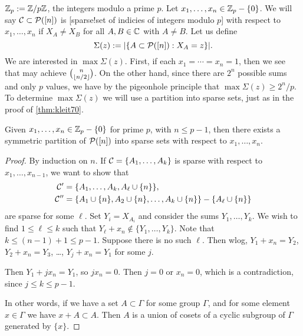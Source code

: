  $\Z_p:=\Z/p\Z$, the integers modulo a prime $p$. Let $x_1,\dotsc,x_n\in \Z_p\setminus\{0\}$. We will say $\Cset \subset \P([n])$ is [sparse!set of indicies of integers modulo $p$] with respect to $x_1,\dotsc,x_n$ if $X_A\neq X_B$ for all $A,B\in \C$ with $A\neq B$.
Let us define
\[
\Sigma(z):= | \{A\subset \P([n]): X_A=z\}|.
\]
We are interested in $\max \Sigma(z)$. First, if each $x_1=\dotsb=x_n=1$, then we see that may achieve ${n \choose \floor{n/2}}$.
On the other hand, since there are $2^n$ possible sums and only $p$ values, we have by the pigeonhole principle that $\max \Sigma(z) \geq 2^n/p$. To determine $\max \Sigma(z)$ we will use a partition into sparse sets, just as in the proof of \cref{thm:kleit70}.
\begin{theorem}
Given $x_1,\dotsc,x_n\in \Z_p\setminus\{0\}$ for prime $p$, with $n\leq p-1$, then there exists a symmetric partition of $\P([n])$ into sparse sets with respect to $x_1,\dotsc,x_n$.
\end{theorem}
\begin{proof}	
By induction on $n$. If $\Cset = \{A_1,\dotsc, A_k\}$ is sparse with respect to $x_1,\dotsc,x_{n-1}$, we want to show that
\begin{align*}	
\Cset' &= \{A_1,\dotsc, A_k, A_{\ell} \cup \{n\}\},\\
\Cset'' &= \{A_1\cup \{n\}, A_2\cup\{n\}, \dotsc, A_k \cup \{n\}\}\setminus \{A_\ell \cup \{n\}\}
\end{align*}
 are sparse for some $\ell$. Set $Y_i = X_{A_i}$ and consider the sums $Y_1,\dotsc,Y_k$. We wish to find $1\leq \ell\leq k$ such that $Y_\ell+x_n \not\in \{Y_1,\dotsc,Y_k\}$. Note that $k\leq (n-1)+1 \leq p-1$. Suppose there is no such $\ell$. Then wlog, $Y_1 + x_n = Y_2$, $Y_2 + x_n = Y_3$, \ldots, $Y_j + x_n = Y_1$ for some $j$.

 Then $Y_1 + j x_n = Y_1$, so $jx_n=0$. Then $j=0$ or $x_n = 0$, which is a contradiction, since $j\leq k\leq p-1$.

 In other words, if we have a set $A\subset \Gamma$ for some group $\Gamma$, and for some element $x\in \Gamma$ we have $x+A \subset A$. Then $A$ is a union of cosets of a cyclic subgroup of $\Gamma$ generated by $\{x\}$.
\end{proof}

